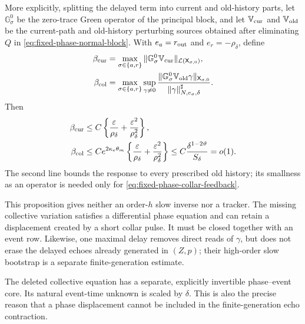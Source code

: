 \begin{proposition}
More explicitly, splitting the delayed term into current and old-history
parts, let \(\mathbb G_\sigma^0\) be the zero-trace Green operator of the
principal block, and let \(\mathbb V_{\rm cur}\) and
\(\mathbb V_{\rm old}\) be the current-path and old-history perturbing
sources obtained after eliminating \(Q\) in
\cref{eq:fixed-phase-normal-block}.  With \(e_a=r_{\rm out}\) and
\(e_r=-\rho_\delta\), define
\begin{align*}
 \beta_{\rm cur}
 &=\max_{\sigma\in\{a,r\}}
   \|\mathbb G_\sigma^0\mathbb V_{\rm cur}\|_{
      \mathcal L(\mathsf X_{\sigma,0})},\\
 \beta_{\rm col}
 &=\max_{\sigma\in\{a,r\}}
   \sup_{\gamma\ne0}
   \frac{\|\mathbb G_\sigma^0\mathbb V_{\rm old}\gamma\|_{
          \mathsf X_{\sigma,0}}}
        {\|\gamma\|_{N,e_\sigma,\delta}^{\sharp}}.
\end{align*}
Then
\begin{align}
 \beta_{\rm cur}
 &\le C\left\{\frac{\varepsilon}{\rho_\delta}
                 +\frac{\varepsilon^2}{\rho_\delta^2}\right\},\notag\\
 \beta_{\rm col}
 &\le Ce^{2\kappa_e\theta_m}
       \left\{\frac{\varepsilon}{\rho_\delta}
                 +\frac{\varepsilon^2}{\rho_\delta^2}\right\}
 \le C\frac{\delta^{1-2\vartheta}}{S_\delta}=o(1). \label{eq:fixed-phase-C0-Neumann-number}
\end{align}
The second line bounds the response to every prescribed old history; its
smallness as an operator is needed only for
\cref{eq:fixed-phase-collar-feedback}.

This proposition gives neither an order-\(h\) slow inverse nor a tracker.
The missing collective variation satisfies a differential phase equation
and can retain a displacement created by a short collar pulse.  It must be
closed together with an event row.  Likewise, one maximal delay removes
direct reads of \(\gamma\), but does not erase the delayed echoes already
generated in \((Z,p)\); their high-order slow bootstrap is a separate
finite-generation estimate.
\end{proposition}

The deleted collective equation has a separate, explicitly invertible
phase--event core.  Its natural event-time unknown is scaled by \(\delta\).
This is also the precise reason that a phase displacement cannot be included
in the finite-generation echo contraction.

